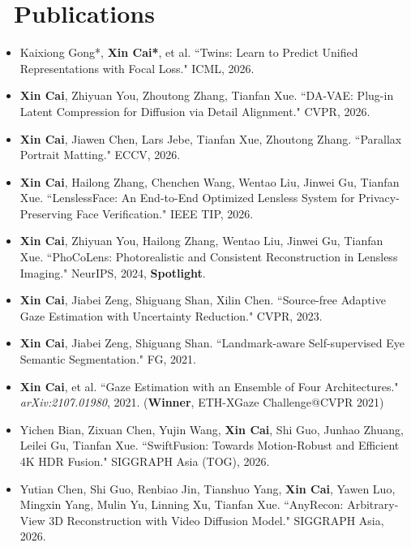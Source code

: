 \documentclass{resume}
\begin{document}
\section{\faBook\ Publications}
\begin{itemize}[parsep=0.5ex]
  \item Kaixiong Gong*, \textbf{Xin Cai*}, et al. ``Twins: Learn to Predict Unified Representations with Focal Loss." ICML, 2026.

  \item \textbf{Xin Cai}, Zhiyuan You, Zhoutong Zhang, Tianfan Xue. ``DA-VAE: Plug-in Latent Compression for Diffusion via Detail Alignment." CVPR, 2026.

  \item \textbf{Xin Cai}, Jiawen Chen, Lars Jebe, Tianfan Xue, Zhoutong Zhang. ``Parallax Portrait Matting." ECCV, 2026.

  \item \textbf{Xin Cai}, Hailong Zhang, Chenchen Wang, Wentao Liu, Jinwei Gu, Tianfan Xue. ``LenslessFace: An End-to-End Optimized Lensless System for Privacy-Preserving Face Verification." IEEE TIP, 2026.

  \item \textbf{Xin Cai}, Zhiyuan You, Hailong Zhang, Wentao Liu, Jinwei Gu, Tianfan Xue. ``PhoCoLens: Photorealistic and Consistent Reconstruction in Lensless Imaging." NeurIPS, 2024, \textbf{Spotlight}.

  \item \textbf{Xin Cai}, Jiabei Zeng, Shiguang Shan, Xilin Chen. ``Source-free Adaptive Gaze Estimation with Uncertainty Reduction." CVPR, 2023.

  \item \textbf{Xin Cai}, Jiabei Zeng, Shiguang Shan. ``Landmark-aware Self-supervised Eye Semantic Segmentation." FG, 2021.

  \item \textbf{Xin Cai}, et al. ``Gaze Estimation with an Ensemble of Four Architectures." \textit{arXiv:2107.01980}, 2021. (\textbf{Winner}, ETH-XGaze Challenge@CVPR 2021)

  \item Yichen Bian, Zixuan Chen, Yujin Wang, \textbf{Xin Cai}, Shi Guo, Junhao Zhuang, Leilei Gu, Tianfan Xue. ``SwiftFusion: Towards Motion-Robust and Efficient 4K HDR Fusion." SIGGRAPH Asia (TOG), 2026.

  \item Yutian Chen, Shi Guo, Renbiao Jin, Tianshuo Yang, \textbf{Xin Cai}, Yawen Luo, Mingxin Yang, Mulin Yu, Linning Xu, Tianfan Xue. ``AnyRecon: Arbitrary-View 3D Reconstruction with Video Diffusion Model." SIGGRAPH Asia, 2026.


\end{itemize}
\end{document}
